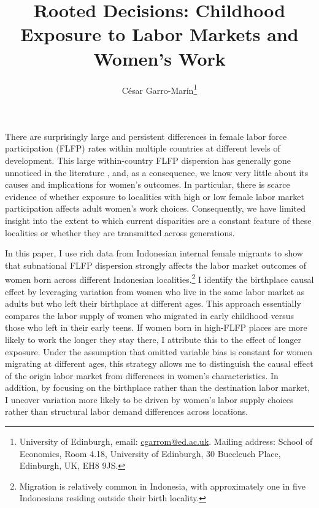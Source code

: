 \documentclass[a4paper, 11pt]{article}
\begin{document}
	
	\title{Rooted Decisions: Childhood Exposure to Labor Markets and Women's Work}	
	\author{C\'esar Garro-Mar\'in\thanks{\noindent University of Edinburgh, email: \href{mailto:cgarrom@ed.ac.uk}{cgarrom@ed.ac.uk}. Mailing address: School of Economics, Room 4.18, University of Edinburgh, 30 Buccleuch Place, Edinburgh, UK, EH8 9JS.}}
	\date{}

	
	\maketitle
	

There are surprisingly large and persistent differences in female labor force participation (FLFP) rates within multiple countries at different levels of development. %
This large within-country FLFP dispersion has generally gone unnoticed in the literature \citep{Charles2018}, and, as a consequence, we know very little about its causes and implications for women's outcomes. In particular, there is scarce evidence of whether exposure to localities with high or low female labor market participation affects adult women's work choices. Consequently, we have limited insight into the extent to which current disparities are a constant feature of these localities or whether they are transmitted across generations.

%

{In this paper, I use rich data from Indonesian internal female migrants to show that subnational FLFP dispersion strongly affects the labor market outcomes of women born across different Indonesian localities.\footnote{Migration is relatively common in Indonesia, with approximately one in five Indonesians residing outside their birth locality.} I identify the birthplace causal effect by leveraging variation from women who live in the same labor market as adults but who left their birthplace at different ages. This approach essentially compares the labor supply of women who migrated in early childhood versus those who left in their early teens. If women born in high-FLFP places are more likely to work the longer they stay there, I attribute this to the effect of longer exposure. Under the assumption that omitted variable bias is constant for women migrating at different ages, this strategy allows me to distinguish the causal effect of the origin labor market from differences in women's characteristics.  In addition, by focusing on the birthplace rather than the destination labor market, I uncover variation more likely to be driven by women's labor supply choices rather than structural labor demand differences across locations.}
\end{document}
